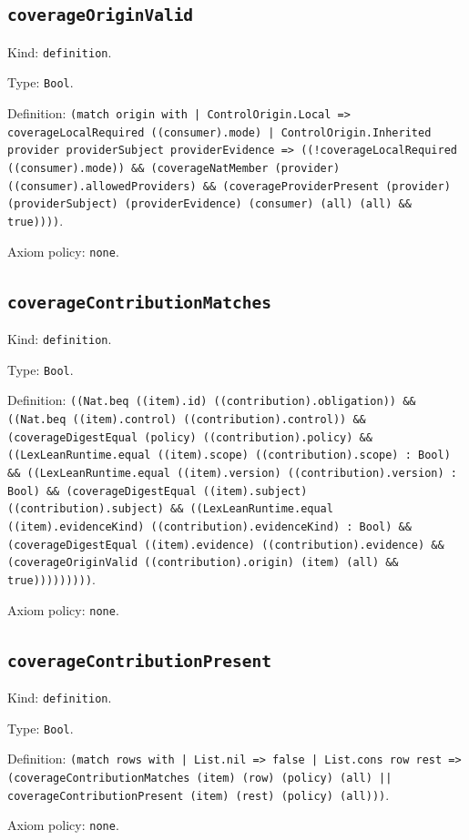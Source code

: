 \documentclass[11pt]{article}
\begin{document}
\subsection*{\texttt{coverageOriginValid}}
\noindent Kind: \texttt{definition}.\par
\noindent Type: \texttt{Bool}.\par
\noindent Definition: \texttt{(match origin with | ControlOrigin.Local => coverageLocalRequired ((consumer).mode) | ControlOrigin.Inherited provider providerSubject providerEvidence => ((!coverageLocalRequired ((consumer).mode)) \&\& (coverageNatMember (provider) ((consumer).allowedProviders) \&\& (coverageProviderPresent (provider) (providerSubject) (providerEvidence) (consumer) (all) (all) \&\& true))))}.\par
\noindent Axiom policy: \texttt{none}.\par
\subsection*{\texttt{coverageContributionMatches}}
\noindent Kind: \texttt{definition}.\par
\noindent Type: \texttt{Bool}.\par
\noindent Definition: \texttt{((Nat.beq ((item).id) ((contribution).obligation)) \&\& ((Nat.beq ((item).control) ((contribution).control)) \&\& (coverageDigestEqual (policy) ((contribution).policy) \&\& ((LexLeanRuntime.equal ((item).scope) ((contribution).scope) : Bool) \&\& ((LexLeanRuntime.equal ((item).version) ((contribution).version) : Bool) \&\& (coverageDigestEqual ((item).subject) ((contribution).subject) \&\& ((LexLeanRuntime.equal ((item).evidenceKind) ((contribution).evidenceKind) : Bool) \&\& (coverageDigestEqual ((item).evidence) ((contribution).evidence) \&\& (coverageOriginValid ((contribution).origin) (item) (all) \&\& true)))))))))}.\par
\noindent Axiom policy: \texttt{none}.\par
\subsection*{\texttt{coverageContributionPresent}}
\noindent Kind: \texttt{definition}.\par
\noindent Type: \texttt{Bool}.\par
\noindent Definition: \texttt{(match rows with | List.nil => false | List.cons row rest => (coverageContributionMatches (item) (row) (policy) (all) || coverageContributionPresent (item) (rest) (policy) (all)))}.\par
\noindent Axiom policy: \texttt{none}.\par
\end{document}
